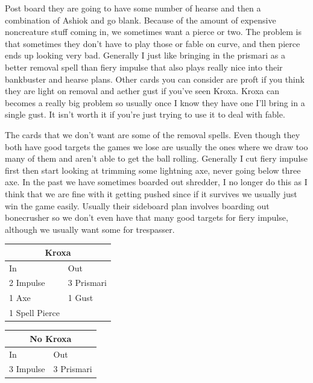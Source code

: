 \documentclass[12pt]{article}
\begin{document}
Post board they are going to have some number of hearse and then a combination of Ashiok and go blank. Because of the amount of expensive noncreature stuff coming in, we sometimes want a pierce or two. The problem is that sometimes they don't have to play those or fable on curve, and then pierce ends up looking very bad. Generally I just like bringing in the prismari as a better removal spell than fiery impulse that also plays really nice into their bankbuster and hearse plans. Other cards you can consider are proft if you think they are light on removal and aether gust if you've seen Kroxa. Kroxa can becomes a really big problem so usually once I know they have one I'll bring in a single gust. It isn't worth it if you're just trying to use it to deal with fable.

The cards that we don't want are some of the removal spells. Even though they both have good targets the games we lose are usually the ones where we draw too many of them and aren't able to get the ball rolling. Generally I cut fiery impulse first then start looking at trimming some lightning axe, never going below three axe. In the past we have sometimes boarded out shredder, I no longer do this as I think that we are fine with it getting pushed since if it survives we usually just win the game easily. Usually their sideboard plan involves boarding out bonecrusher so we don't even have that many good targets for fiery impulse, although we usually want some for trespasser.

\begin{center}
    \begin{minipage}[t]{0.35\linewidth}
        \begin{tabular}[t]{|l|l|}
            \multicolumn{2}{c}{\textbf{Kroxa}} \\
            \hline
            In             & Out               \\
            \hline
            2 Impulse      & 3 Prismari        \\
            1 Axe          & 1 Gust            \\
            1 Spell Pierce &                   \\
            \hline
        \end{tabular}
    \end{minipage}
    \quad
    \begin{minipage}[t]{0.35\linewidth}
        \begin{tabular}[t]{|l|l|}
            \multicolumn{2}{c}{\textbf{No Kroxa}} \\
            \hline
            In        & Out                       \\
            \hline
            3 Impulse & 3 Prismari                \\
            \hline
        \end{tabular}
    \end{minipage}
\end{center}
\end{document}
